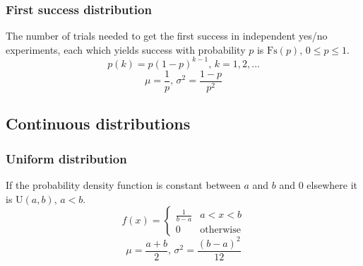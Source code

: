 \subsubsection{First success distribution}
The number of trials needed to get the first success in independent yes/no experiments, each which yields success with probability $p$ is $\textrm{Fs}(p),\,0\leq p\leq1$.
\[p(k)=p(1-p)^{k-1},\,k=1,2,\dots\]
\[\mu = \frac1p,\,\sigma^2=\frac{1-p}{p^2}\]

\subsection{Continuous distributions}

\subsubsection{Uniform distribution}
If the probability density function is constant between $a$ and $b$ and 0 elsewhere it is $\textrm{U}(a,b),\,a<b$.
\[f(x) = \left\{
\begin{array}{cl}
\frac{1}{b-a} & a<x<b\\
0 & \textrm{otherwise}
\end{array}\right.\]
\[\mu=\frac{a+b}{2},\,\sigma^2=\frac{(b-a)^2}{12}\]
